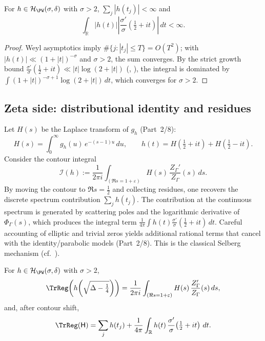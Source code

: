 \begin{lemma}
\label{lem:abs-L1}
For $h\in\mathcal{H}_{\PW}(\sigma,\delta)$ with $\sigma>2$,
$\sum_j|h(t_j)|<\infty$ and
\[
\int_{\mathbb{R}}|h(t)|
\left|\frac{\sigma'}{\sigma}\!\left(\tfrac12+it\right)\right|\,dt<\infty.
\]
\end{lemma}

\begin{proof}
Weyl asymptotics imply $\#\{j:|t_j|\le T\}=O(T^2)$; with
$|h(t)|\ll (1+|t|)^{-\sigma}$ and $\sigma>2$, the sum converges.
By the strict growth bound
$\frac{\sigma'}{\sigma}(\tfrac12+it)\ll |t|\log(2+|t|)$
(\cite[Thm.~6.6]{IwaniecSpectral}, \cite[Prop.~4.3]{Borthwick}),
the integral is dominated by $\int (1+|t|)^{-\sigma+1}\log(2+|t|)\,dt$,
which converges for $\sigma>2$.                                          %
\end{proof}

\subsection{Zeta side: distributional identity and residues}
\label{subsec:zeta-side}
\relax\hspace{0pt}

Let $H(s)$ be the Laplace transform of $g_h$ (Part~2/8):
\[
H(s)=\int_0^\infty g_h(u)\,e^{-(s-1)u}\,du,\qquad
h(t)=H\!\left(\tfrac12+it\right)+H\!\left(\tfrac12-it\right).
\]
Consider the contour integral
\[
\mathcal{I}(h):=\frac{1}{2\pi i}\int_{(\Re s=1+\varepsilon)}
H(s)\,\frac{Z_\Gamma'}{Z_\Gamma}(s)\,ds.
\]
By moving the contour to $\Re s=\tfrac12$ and collecting residues,
one recovers the discrete spectrum contribution
$\sum_jh(t_j)$. The contribution at the continuous spectrum
is generated by scattering poles and the logarithmic derivative of
$\Phi_\Gamma(s)$, which produces the integral term
$\frac{1}{4\pi}\int h(t)\frac{\sigma'}{\sigma}(\tfrac12+it)\,dt$.
Careful accounting of elliptic and trivial zeros yields additional
rational terms that cancel with the identity/parabolic models (Part~2/8).
This is the classical Selberg mechanism (cf.\ \cite{HejhalII}).          %

\begin{proposition}[Zeta–operator equivalence $E_1(h)=E_3(h)$]
\label{prop:zeta-operator}
For $h\in\mathcal{H}_{\PW}(\sigma,\delta)$ with $\sigma>2$,
\[
\TrReg\!\left(h\!\left(\sqrt{\Delta-\tfrac14}\right)\right)
=\frac{1}{2\pi i}\int_{(\Re s=1+\varepsilon)}H(s)
\,\frac{Z_\Gamma'}{Z_\Gamma}(s)\,ds,
\]
and, after contour shift,
\[
\TrReg(\mathsf{H})
=\sum_{j}h(t_j)+\frac{1}{4\pi}\int_{\mathbb{R}}
h(t)\,\frac{\sigma'}{\sigma}\!\left(\tfrac12+it\right)\,dt.
\]
\end{proposition}

